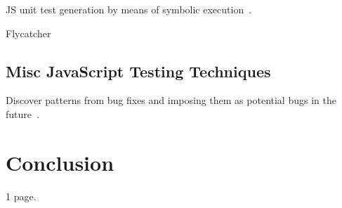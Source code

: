 \documentclass[sigconf]{acmart}
\begin{document}
JS unit test generation by means of symbolic execution~\cite{tanida2014automatic}.

Flycatcher~\cite{deautomatic}

\subsection{Misc JavaScript Testing Techniques}
\label{sub.sec.misc.test.tech}

Discover patterns from bug fixes and imposing them as potential bugs in the future~\cite{quinn:fse16}. 

\section{Conclusion}
\label{sec:concl}
1 page.


 
\end{document}
